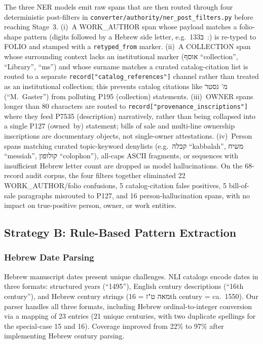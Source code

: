 \documentclass[Afour,sageh,times]{sagej}
\newcommand{\texthebrew}[1]{{\hebrewfont #1}}
\begin{document}
The three NER models emit raw spans that are then routed through four deterministic post-filters in \texttt{converter/authority/ner\_post\_filters.py} before reaching Stage~3. (i)~A WORK\_AUTHOR span whose payload matches a folio-shape pattern (digits followed by a Hebrew side letter, e.g.\ \texthebrew{133ב~:}) is re-typed to FOLIO and stamped with a \texttt{retyped\_from} marker. (ii)~A COLLECTION span whose surrounding context lacks an institutional marker (\texthebrew{אוסף} ``collection'', ``Library'', ``ms'') and whose surname matches a curated catalog-citation list is routed to a separate \texttt{record["catalog\_references"]} channel rather than treated as an institutional collection; this prevents catalog citations like \texthebrew{מ' גסטר} (``M.\ Gaster'') from polluting P195 (collection) statements. (iii)~OWNER spans longer than 80 characters are routed to \texttt{record["provenance\_inscriptions"]} where they feed P7535 (description) narratively, rather than being collapsed into a single P127 (owned~by) statement; bills of sale and multi-line ownership inscriptions are documentary objects, not single-owner attestations. (iv)~Person spans matching curated topic-keyword denylists (e.g.\ \texthebrew{קבלה} ``kabbalah'', \texthebrew{משיח} ``messiah'', \texthebrew{קולופון} ``colophon''), all-caps ASCII fragments, or sequences with insufficient Hebrew letter count are dropped as model hallucinations. On the 68-record audit corpus, the four filters together eliminated 22 WORK\_AUTHOR/folio confusions, 5 catalog-citation false positives, 5 bill-of-sale paragraphs misrouted to P127, and 16 person-hallucination spans, with no impact on true-positive person, owner, or work entities.

\subsection{Strategy B: Rule-Based Pattern Extraction}

\subsubsection{Hebrew Date Parsing}

Hebrew manuscript dates present unique challenges. NLI catalogs encode dates in three formats: structured years (``1495''), English century descriptions (``16th century''), and Hebrew century strings (\texthebrew{מאה ט"ז} = 16th century = ca.~1550). Our parser handles all three formats, including Hebrew ordinal-to-integer conversion via a mapping of 23 entries (21 unique centuries, with two duplicate spellings for the special-case 15 and 16). Coverage improved from 22\% to 97\% after implementing Hebrew century parsing.
\end{document}
